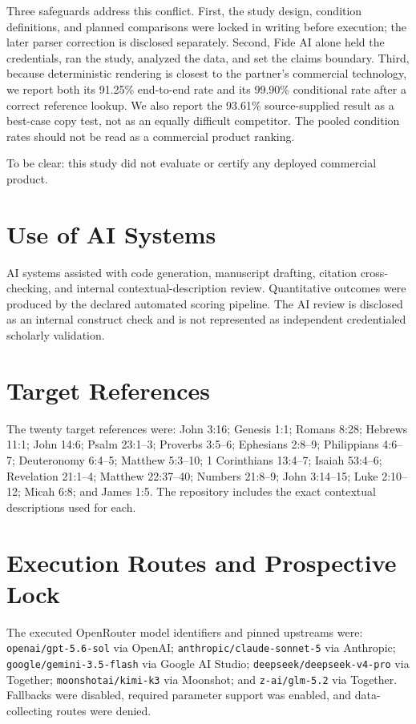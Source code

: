 \documentclass[11pt]{article}
\begin{document}
Three safeguards address this conflict. First, the study design, condition
definitions, and planned comparisons were locked in writing before execution;
the later parser correction is disclosed separately. Second, Fide AI alone
held the credentials, ran the study, analyzed the data, and set the claims
boundary. Third, because deterministic rendering is closest to the partner's
commercial technology, we report both its 91.25\% end-to-end rate and its
99.90\% conditional rate after a correct reference lookup. We also report the
93.61\% source-supplied result as a best-case copy test, not as an equally
difficult competitor. The pooled condition rates should not be read as a
commercial product ranking.

To be clear: this study did not evaluate or certify any deployed
commercial product.

\section*{Use of AI Systems}

AI systems assisted with code generation, manuscript drafting, citation
cross-checking, and internal contextual-description review. Quantitative
outcomes were produced by the declared automated scoring pipeline. The AI
review is disclosed as an internal construct check and is not represented as
independent credentialed scholarly validation.

\appendix

\section{Target References}
\label{app:targets}

The twenty target references were: John 3:16; Genesis 1:1; Romans 8:28;
Hebrews 11:1; John 14:6; Psalm 23:1--3; Proverbs 3:5--6; Ephesians 2:8--9;
Philippians 4:6--7; Deuteronomy 6:4--5; Matthew 5:3--10;
1 Corinthians 13:4--7; Isaiah 53:4--6; Revelation 21:1--4;
Matthew 22:37--40; Numbers 21:8--9; John 3:14--15; Luke 2:10--12;
Micah 6:8; and James 1:5. The repository includes the exact
contextual descriptions used for each.

\section{Execution Routes and Prospective Lock}
\label{app:routes}

The executed OpenRouter model identifiers and pinned upstreams were:
\texttt{openai/gpt-5.6-sol} via OpenAI;
\texttt{anthropic/claude-sonnet-5} via Anthropic;
\texttt{google/gemini-3.5-flash} via Google AI Studio;
\texttt{deepseek/deepseek-v4-pro} via Together;
\texttt{moonshotai/kimi-k3} via Moonshot; and
\texttt{z-ai/glm-5.2} via Together. Fallbacks were disabled, required parameter
support was enabled, and data-collecting routes were denied.
\end{document}
